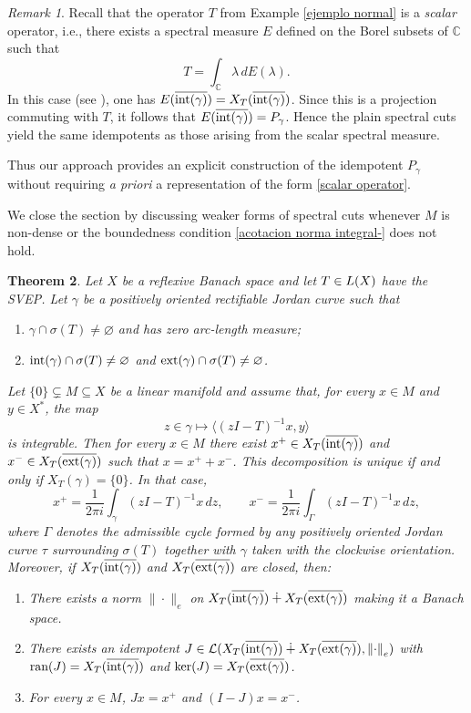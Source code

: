 \documentclass[11pt]{amsart}
\newtheorem{theorem}{Theorem}[section]
\theoremstyle{definition}
\theoremstyle{remark}
\newtheorem{remark}[theorem]{Remark}
\numberwithin{equation}{section}
\newcommand{\norm}[1]{\left\|#1\right\|}
\newcommand{\ran}{\textnormal{ran}}
\newcommand{\EL}{\mathcal{L}}
\newcommand{\C}{\mathbb{C}}
\newcommand{\Xint}{X_T(\overline{\inte(\gamma)})}
\newcommand{\Xext}{X_T(\overline{\exte(\gamma)})}
\newcommand{\inte}{\textnormal{int}}
\newcommand{\exte}{\textnormal{ext}}
\begin{document}
\begin{remark} Recall that the operator $T$ from Example \ref{ejemplo normal} is a \textit{scalar} operator, i.e., there exists a spectral measure
$E$ defined on the Borel subsets of $\C$ such that
\begin{equation}\label{scalar operator}
T=\int_\C \lambda\, dE(\lambda).
\end{equation}
In this case (see \cite{LN00}), one has $E(\overline{\inte(\gamma)})=\Xint$.
Since this is a projection commuting with $T$, it follows that
$E(\overline{\inte(\gamma)})=P_\gamma$. Hence the plain spectral cuts yield
the same idempotents as those arising from the scalar spectral measure.

\noindent Thus our approach provides an explicit construction of the idempotent $P_\gamma$
without requiring \emph{a priori} a representation of the form \eqref{scalar operator}.
\end{remark}


\medskip

We close the section by discussing weaker forms of spectral cuts whenever $M$ is non-dense or the boundedness condition \eqref{acotacion norma integral-} does not hold.

\smallskip

\begin{theorem}\label{teorema linear manifold}
Let $X$ be a reflexive Banach space and let $T\in\mathcal \EL(X)$ have the SVEP.
Let $\gamma$ be a positively oriented rectifiable Jordan curve such that
\begin{enumerate}
\item[(i)] $\gamma\cap\sigma(T)\neq\varnothing$ and has zero arc-length measure;
\item[(ii)] $\inte(\gamma)\cap\sigma(T)\neq\varnothing$ and $\exte(\gamma)\cap\sigma(T)\neq\varnothing$.
\end{enumerate}
Let $\{0\}\subsetneq M\subseteq X$ be a linear manifold and assume that, for every
$x\in M$ and $y\in X^*$, the map
$$
z\in\gamma \mapsto \langle (zI-T)^{-1}x,y\rangle
$$
is integrable. Then for every $x\in M$ there exist $x^+\in\Xint$ and
$x^-\in\Xext$ such that $x=x^++x^-$. This decomposition is unique if and only if
$X_T(\gamma)=\{0\}$. In that case,
$$
x^+=\frac{1}{2\pi i}\int_\gamma (zI-T)^{-1}x\,dz,
\qquad
x^-=\frac{1}{2\pi i}\int_\Gamma (zI-T)^{-1}x\,dz,
$$
where $\Gamma$ denotes the admissible cycle formed by any positively oriented
Jordan curve $\tau$ surrounding $\sigma(T)$ together with $\gamma$ taken with
the clockwise orientation. Moreover, if $\Xint$ and $\Xext$ are closed, then:
\begin{enumerate}
\item[(a)] There exists a norm $\|\cdot\|_e$ on $\Xint\dotplus\Xext$ making it a Banach space.
\item[(b)] There exists an idempotent $J\in\mathcal{L}(\Xint\dotplus\Xext, \norm{\cdot}_e)$ with
$\ran(J)=\Xint$ and $\ker(J)=\Xext$.
\item[(c)] For every $x\in M$, $Jx=x^+$ and $(I-J)x=x^-$.
\end{enumerate}
\end{theorem}
\end{document}

